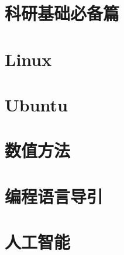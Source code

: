 \documentclass[cn,11pt,chinese,twoside]{elegantbook}
\begin{document}
\part{科研基础必备篇}


\part{Linux}







\part{Ubuntu}



\part{数值方法}


\part{编程语言导引}


\part{人工智能}

\end{document}
